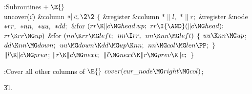 \Y\B\4:Subroutines\X${}\mathrel+\E{}$\6
\\{uncover}(\|c)\1\1\6
\&{column} ${}{*}\|c;\2\2{}$\6
${}\{{}$\5
\1\&{register} \&{column} ${}{*}\|l,{}$ ${}{*}\|r;{}$\6
\&{register} \&{node} ${}{*}\\{rr},{}$ ${}{*}\\{nn},{}$ ${}{*}\\{uu},{}$ ${}{*}%
\\{dd};{}$\7
\&{for} ${}(\\{rr}\K\|c\MG\\{head}.\\{up};{}$ ${}\\{rr}\I{\AND}(\|c\MG%
\\{head});{}$ ${}\\{rr}\K\\{rr}\MG\\{up}){}$\1\6
\&{for} ${}(\\{nn}\K\\{rr}\MG\\{left};{}$ ${}\\{nn}\I\\{rr};{}$ ${}\\{nn}\K%
\\{nn}\MG\\{left}){}$\5
${}\{{}$\1\6
${}\\{uu}\K\\{nn}\MG\\{up}{}$;\5
${}\\{dd}\K\\{nn}\MG\\{down};{}$\6
${}\\{uu}\MG\\{down}\K\\{dd}\MG\\{up}\K\\{nn};{}$\6
${}\\{nn}\MG\\{col}\MG\\{len}\PP;{}$\6
\4${}\}{}$\2\2\6
${}\|l\K\|c\MG\\{prev}{}$;\5
${}\|r\K\|c\MG\\{next};{}$\6
${}\|l\MG\\{next}\K\|r\MG\\{prev}\K\|c;{}$\6
\4${}\}{}$\2\par
\fi

\B{}:Cover all other columns of \X${}\E{}$\6
$\\{cover}(\\{cur\_node}\MG\\{right}\MG\\{col}){}$;\par
\U31.\fi

